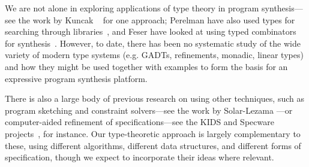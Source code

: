 We are not alone in exploring applications of type theory in program
synthesis---see the work by Kuncak
\etal~\cite{kuncak-pldi-2010,gvero-pldi-2013} for one approach;
Perelman \etal{} have also used types for searching through
libraries~\cite{perelman-pldi-2012}, and Feser \etal{} have looked at
using typed combinators for synthesis~\cite{Feser:2015}.  However, to
date, there has been no systematic study of the wide variety of modern
type systems (e.g. GADTs, refinements, monadic, linear types) and how
they might be used together with examples to form the basis for an
expressive program synthesis platform.

There is also a large body of previous research on using other
techniques, such as program sketching and constraint solvers---see the
work by Solar-Lezama \etal{}
\cite{solar-lezama-thesis-2008,solar-lezama-pldi-2008,solar-lezama-pldi-2007,solar-lezama-pldi-2005}
---or computer-aided refinement of specifications---see the KIDS and
Specware
projects~\cite{smith2008generating,smith1996toward,smith1999mechanizing},
for instance.  Our type-theoretic approach is largely complementary to
these, using different algorithms, different data structures, and
different forms of specification, though we expect to incorporate
their ideas where relevant.






